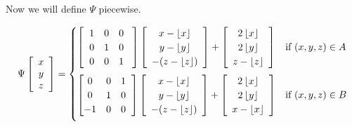 \documentclass[]{article}
\begin{document}
Now we will define $\Psi$ piecewise.

\begin{equation}
\Psi\left[\begin{array}{c}
	x\\y\\z
\end{array}\right] 
= 
\begin{cases}
	\left[ \hspace{2mm} \begin{matrix}
		1 & 0 & 0 \\
		0 & 1 & 0 \\
		0 & 0 & 1
	\end{matrix}\hspace{3mm}\right]

	\left[\begin{array}{c}
	x - \left\lfloor x \right\rfloor
	\\ y- \left\lfloor y \right\rfloor
	\\ -(z - \left\lfloor z \right\rfloor)
	\end{array} \right]
	+
	\left[\begin{array}{c}
		2 \left\lfloor x \right\rfloor
		\\ 2\left\lfloor y \right\rfloor
		\\ z - \left\lfloor z \right\rfloor
	\end{array} \right]
		& \text{if } (x,y,z)\in A	\vspace{2mm}
	\\
		
		
	\left[ \begin{matrix}
	0 & 0 & 1 \\
	0 & 1 & 0 \\
	-1 & 0 & 0
	\end{matrix}\hspace{2mm}\right]
	\left[\begin{array}{c}
		x - \left\lfloor x \right\rfloor
		\\ y- \left\lfloor y \right\rfloor
		\\ -(z - \left\lfloor z \right\rfloor)
		\end{array} \right]
	+
		\left[\begin{array}{c}
			2 \left\lfloor x \right\rfloor
			\\ 2\left\lfloor y \right\rfloor
			\\ x - \left\lfloor x \right\rfloor
		\end{array} \right]
			& \text{if } (x,y,z)\in B	\vspace{2mm}
	\\
	

\end{cases}
\end{equation}
\end{document}
